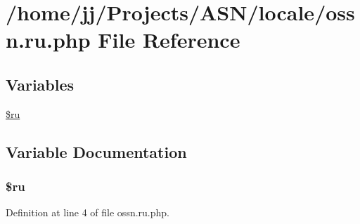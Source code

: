 \hypertarget{locale_2ossn_8ru_8php}{}\section{/home/jj/\+Projects/\+A\+S\+N/locale/ossn.ru.\+php File Reference}
\label{locale_2ossn_8ru_8php}
\subsection*{Variables}
\begin{DoxyCompactItemize}
\item 
\hyperlink{locale_2ossn_8ru_8php_aab84a3feda2b0e489cac7cd194e8d726}{\$ru}
\end{DoxyCompactItemize}


\subsection{Variable Documentation}
\subsubsection[{\texorpdfstring{\$ru}{$ru}}]{\setlength{\rightskip}{0pt plus 5cm}\$ru}\hypertarget{locale_2ossn_8ru_8php_aab84a3feda2b0e489cac7cd194e8d726}{}\label{locale_2ossn_8ru_8php_aab84a3feda2b0e489cac7cd194e8d726}


Definition at line 4 of file ossn.\+ru.\+php.

